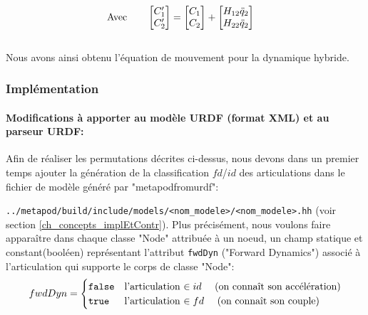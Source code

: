 \documentclass{report}
\begin{document}
\begin{align}
&\textnormal{Avec} \qquad
\begin{bmatrix}
  C'_{1} \\
  C'_{2}
\end{bmatrix}
=
\begin{bmatrix}
  C_{1} \\
  C_{2}
\end{bmatrix}
+
\begin{bmatrix}
  H_{12} \ddot{q}_2 \\
  H_{22} \ddot{q}_2
\end{bmatrix}
\end{align}
\\
Nous avons ainsi obtenu l'équation de mouvement pour la dynamique hybride.

\subsubsection{Implémentation} \label{ch_implURDF}

\paragraph{Modifications à apporter au modèle URDF (format XML) et au parseur URDF:}

Afin de réaliser les permutations décrites ci-dessus, nous devons dans un premier temps ajouter la génération de la classification $fd$/$id$ des articulations dans le fichier de modèle généré par "metapodfromurdf":

\noindent
\verb;../metapod/build/include/models/<nom_modele>/<nom_modele>.hh; (voir section \ref{ch_concepts_implEtContr}). Plus précisément, nous voulons faire apparaître dans chaque classe "Node" attribuée à un noeud, un champ statique et constant\footnotemark[1] (booléen) représentant l'attribut \verb;fwdDyn; ("Forward Dynamics") associé à l'articulation qui supporte le corps de classe "Node":
\begin{equation*}
fwdDyn = 
\begin{cases}
  \verb;false; & \textnormal{l'articulation $\in id \quad$ (on connaît son accélération)} \\
  \verb;true; & \textnormal{l'articulation $\in fd \quad$ (on connaît son couple)}
\end{cases}
\end{equation*}

\end{document}
